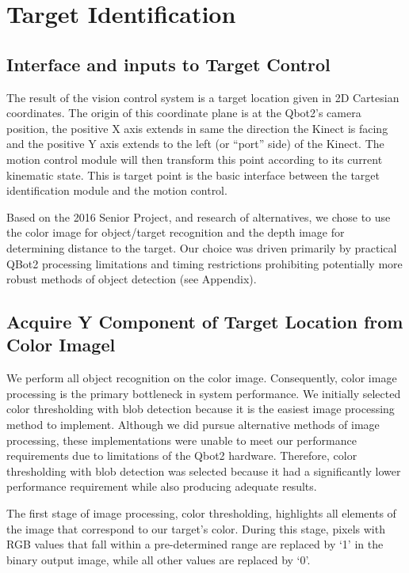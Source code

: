 \section{Target Identification}
\subsection{Interface and inputs to Target Control}
The result of the vision control system is a target location given in 2D Cartesian coordinates. The origin of this coordinate plane is at the Qbot2’s camera position, the positive X axis extends in same the direction the Kinect is facing and the positive Y axis extends to the left (or “port” side) of the Kinect.  The motion control module will then transform this point according to its current kinematic state.   This is target point is the basic interface between the target identification module and the motion control.

Based on the 2016 Senior Project, and research of alternatives, we chose to use the color image for object/target recognition and the depth image for determining distance to the target. Our choice was driven primarily by practical QBot2 processing limitations and timing restrictions prohibiting potentially more robust methods of object detection (see Appendix).

\subsection{Acquire Y Component of Target Location from Color Imagel}
We perform all object recognition on the color image.  Consequently, color image processing is the primary bottleneck in system performance.  We initially selected color thresholding with blob detection because it is the easiest image processing method to implement.  Although we did pursue alternative methods of image processing, these implementations were unable to meet our performance requirements due to limitations of the Qbot2 hardware.  Therefore, color thresholding with blob detection was selected because it had a significantly lower performance requirement while also producing adequate results. 

The first stage of image processing, color thresholding, highlights all elements of the image that correspond to our target’s color.  During this stage, pixels with RGB values that fall within a pre-determined range are replaced by ‘1’ in the binary output image, while all other values are replaced by ‘0’.  


